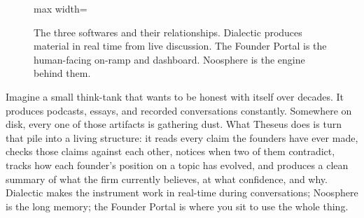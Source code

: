 \documentclass[11pt]{article}
\begin{document}
\begin{figure}[H]
\centering
\begin{adjustbox}{max width=\textwidth}
\end{adjustbox}
\caption{The three softwares and their relationships. Dialectic produces material in real time from live discussion. The Founder Portal is the human-facing on-ramp and dashboard. Noosphere is the engine behind them.}
\end{figure}

\begin{intuitionbox}
Imagine a small think-tank that wants to be honest with itself over decades. It produces podcasts, essays, and recorded conversations constantly. Somewhere on disk, every one of those artifacts is gathering dust. What Theseus does is turn that pile into a living structure: it reads every claim the founders have ever made, checks those claims against each other, notices when two of them contradict, tracks how each founder's position on a topic has evolved, and produces a clean summary of what the firm currently believes, at what confidence, and why. Dialectic makes the instrument work in real-time during conversations; Noosphere is the long memory; the Founder Portal is where you sit to use the whole thing.
\end{intuitionbox}
\end{document}

